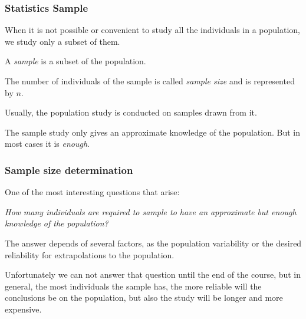 \begin{frame}
\frametitle{Statistics Sample}
When it is not possible or convenient to study all the individuals in a population, we study only a subset of them. 

\begin{definition}[Sample]
A \emph{sample} is a subset of the population.
\end{definition}

\begin{definition}
The number of individuals of the sample is called \emph{sample size} and is represented by $n$.
\end{definition}

Usually, the population study is conducted on samples drawn from it. 

The sample study only gives an approximate knowledge of the population. But in most cases it is \emph{enough}.
\end{frame}


\begin{frame}
\frametitle{Sample size determination}
One of the most interesting questions that arise:
\begin{center}
\alert{\emph{How many individuals are required to sample to have an approximate but enough knowledge of the
population?}}
\end{center}

The answer depends of several factors, as the population variability or the desired reliability for extrapolations to the population.

Unfortunately we can not answer that question until the end of the course, but in general, the most individuals the sample has, the more reliable will the conclusions be on the population, but also the study will be longer and more
expensive.
\end{frame}



